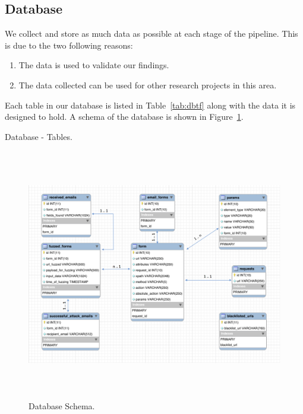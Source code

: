 \subsection{Database}
We collect and store as much data as possible at each stage of the pipeline. This is due to the two following reasons:
\begin{enumerate}
	\item The data is used to validate our findings.
	\item The data collected can be used for other research projects in this area.
\end{enumerate}
Each table in our database is listed in Table~\ref{tab:dbtf} along with the data it is designed to hold. A schema of the database is shown in Figure~\ref{fig:dbschema}.


\begin{table}[!htbp]
	\centering
	        
	\caption{Database - Tables.}
	\label{tab:dbtf}
\end{table}

\begin{figure}[!htbp]
	\centering
	\includegraphics[width=15cm, height=11cm]{System/dbschema}
	\caption{Database Schema.}
	\label{fig:dbschema}
\end{figure}

